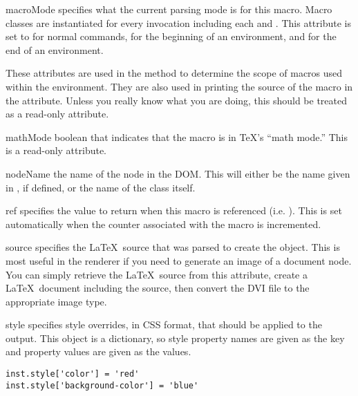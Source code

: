 \begin{memberdesc}[Macro]{macroMode}
specifies what the current parsing mode is for this macro.  Macro classes
are instantiated for every invocation including each  and 
.  This attribute is set to  for normal
commands,  for the beginning of an environment,
and  for the end of an environment.  

These attributes are used in the  method to determine the
scope of macros used within the environment.  They are also used in printing
the source of the macro in the  attribute.  Unless you 
really know what you are doing, this should be treated as a read-only attribute.
\end{memberdesc}

\begin{memberdesc}[Macro]{mathMode}
boolean that indicates that the macro is in \TeX's ``math mode.''  This
is a read-only attribute.
\end{memberdesc}

\begin{memberdesc}[Macro]{nodeName}
the name of the node in the DOM.  This will either be the name given in
, if defined, or the name of the class itself.
\end{memberdesc}

\begin{memberdesc}[Macro]{ref}
specifies the value to return when this macro is referenced (i.e. ).
This is set automatically when the counter associated with the macro is
incremented.
\end{memberdesc}

\begin{memberdesc}[Macro]{source}
specifies the \LaTeX\ source that was parsed to create the object.  This
is most useful in the renderer if you need to generate an image of a
document node.  You can simply retrieve the \LaTeX\ source from this 
attribute, create a \LaTeX\ document including the source, then convert
the DVI file to the appropriate image type.
\end{memberdesc}

\begin{memberdesc}[Macro]{style}
specifies style overrides, in CSS format, that should be applied to the
output.  This object is a dictionary, so style property names are given
as the key and property values are given as the values.
\begin{verbatim}
inst.style['color'] = 'red'
inst.style['background-color'] = 'blue'
\end{verbatim}
\end{memberdesc}

